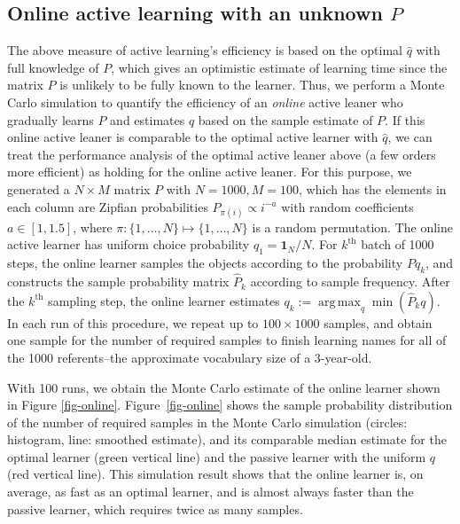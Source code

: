 \documentclass[a4paper,natbib,man]{apa6}
\newcommand{\one}[1]{\mathbf{1}_{#1}}
\DeclareMathOperator*{\argmax}{arg\,max} %
\begin{document}
\subsection{Online active learning with an unknown $P$}
The above measure of active learning's efficiency is based on the optimal $\hat{q}$ with full knowledge of $P$, which gives an optimistic estimate of learning time since the matrix $P$ is unlikely to be fully known to the learner. 
Thus, we perform a Monte Carlo simulation to quantify the efficiency of an {\it online} active leaner who gradually learns $P$ and estimates $q$ based on the sample estimate of $P$. 
If this online active leaner is comparable to the optimal active learner with $\hat{q}$, we can treat the performance analysis of the optimal active leaner above (a few orders more efficient) as holding for the online active leaner. 
For this purpose, we generated a $N \times M$ matrix $P$ with $N=1000, M=100$, which has the elements in each column are Zipfian probabilities $P_{\pi(i)} \propto i^{-a}$ with random coefficients $a \in [1, 1.5]$, where $\pi: \{1, \ldots, N\} \mapsto \{1, \ldots, N\}$ is a random permutation. 
The online active learner has uniform choice probability $q_{1} = \one{N}/N$. 
For $k^{\text{th}}$ batch of 1000 steps, the online learner samples the objects according to the probability $P q_{k}$, and constructs the sample probability matrix $\hat{P}_{k}$ according to sample frequency. 
After the $k^{\text{th}}$ sampling step, the online learner estimates $q_{k} := \argmax_{q} \min( \hat{P}_{k} q )$. 
In each run of this procedure, we repeat up to $100 \times 1000$ samples, and obtain one sample for the number of required samples to finish learning names for all of the 1000 referents--the approximate vocabulary size of a 3-year-old. 

With 100 runs, we obtain the Monte Carlo estimate of the online learner shown in Figure \ref{fig-online}.
Figure~\ref{fig-online} shows the sample probability distribution of the number of required samples in the Monte Carlo simulation (circles: histogram, line: smoothed estimate), and its comparable median estimate for the optimal learner (green vertical line) and the passive learner with the uniform $q$ (red vertical line).
This simulation result shows that the online learner is, on average, as fast as an optimal learner, and is almost always faster than the passive learner, which requires twice as many samples.
\end{document}

